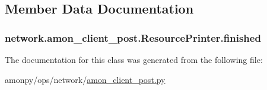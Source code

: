 \subsection{Member Data Documentation}
\hypertarget{classnetwork_1_1amon__client__post_1_1_resource_printer_a56fa727823bc165a6a851645a652170c}{
\subsubsection[{finished}]{\setlength{\rightskip}{0pt plus 5cm}network.\-amon\-\_\-client\-\_\-post.\-Resource\-Printer.\-finished}}\label{classnetwork_1_1amon__client__post_1_1_resource_printer_a56fa727823bc165a6a851645a652170c}


The documentation for this class was generated from the following file\-:\begin{DoxyCompactItemize}
\item 
amonpy/ops/network/\hyperlink{amon__client__post_8py}{amon\-\_\-client\-\_\-post.\-py}\end{DoxyCompactItemize}
